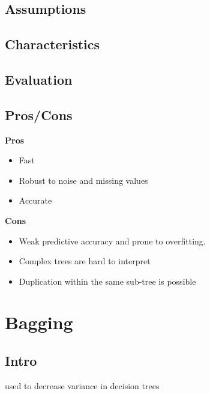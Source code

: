\documentclass[]{book}
\begin{document}
\hypertarget{assumptions-5}{%
\subsection{Assumptions}\label{assumptions-5}}

\hypertarget{characteristics-4}{%
\subsection{Characteristics}\label{characteristics-4}}

\hypertarget{evaluation-5}{%
\subsection{Evaluation}\label{evaluation-5}}

\hypertarget{proscons-5}{%
\subsection{Pros/Cons}\label{proscons-5}}

\textbf{Pros}

\begin{itemize}
\item
  Fast
\item
  Robust to noise and missing values
\item
  Accurate
\end{itemize}

\textbf{Cons}

\begin{itemize}
\item
  Weak predictive accuracy and prone to overfitting.
\item
  Complex trees are hard to interpret
\item
  Duplication within the same sub-tree is possible
\end{itemize}

\hypertarget{bagging}{%
\section{Bagging}\label{bagging}}

\hypertarget{intro-6}{%
\subsection{Intro}\label{intro-6}}

used to decrease variance in decision trees
\end{document}
